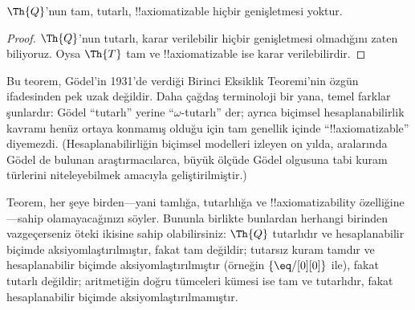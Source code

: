 \documentclass[../../../include/open-logic-section]{subfiles}
\begin{document}


\begin{thm}
$\Th{Q}$'nun tam, tutarlı, !!{axiomatizable} hiçbir genişletmesi yoktur.
\end{thm}

\begin{proof}
$\Th{Q}$'nun tutarlı, karar verilebilir hiçbir genişletmesi olmadığını zaten
biliyoruz. Oysa $\Th{T}$ tam ve !!{axiomatizable} ise karar verilebilirdir.
\end{proof}

\begin{explain}
Bu teorem, G\"odel'in 1931'de verdiği Birinci Eksiklik Teoremi'nin özgün
ifadesinden pek uzak değildir. Daha çağdaş terminoloji bir yana, temel
farklar şunlardır: G\"odel “tutarlı” yerine “$\omega$-tutarlı” der; ayrıca
biçimsel hesaplanabilirlik kavramı henüz ortaya konmamış olduğu için tam
genellik içinde “!!{axiomatizable}” diyemezdi. (Hesaplanabilirliğin biçimsel
modelleri izleyen on yılda, aralarında G\"odel de bulunan araştırmacılarca,
büyük ölçüde G\"odel olgusuna tabi kuram türlerini niteleyebilmek amacıyla
geliştirilmiştir.)

Teorem, her şeye birden---yani tamlığa, tutarlılığa ve
!!{axiomatizability} özelliğine---sahip olamayacağınızı söyler. Bununla
birlikte bunlardan herhangi birinden vazgeçerseniz öteki ikisine sahip
olabilirsiniz: $\Th{Q}$ tutarlıdır ve hesaplanabilir biçimde
aksiyomlaştırılmıştır, fakat tam değildir; tutarsız kuram tamdır ve
hesaplanabilir biçimde aksiyomlaştırılmıştır (örneğin
$\{ \eq/[0][0] \}$ ile), fakat tutarlı değildir; aritmetiğin doğru tümceleri
kümesi ise tam ve tutarlıdır, fakat hesaplanabilir biçimde
aksiyomlaştırılmamıştır.
\end{explain}
\end{document}
